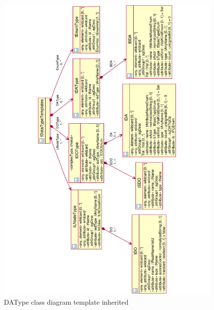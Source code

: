\begin{landscape}
	\begin{figure}
	  \includegraphics[angle=-90, width=1.0\linewidth]{chapters/ch-scl/figures/SCL-uml-DATypeTemplate-Deept2-inherited}
	  \caption{DAType class diagram template inherited}  
	  \label{fig:pdf-SCL-uml-DATypeTemplate-Deept2-inherited}
	\end{figure}
\end{landscape}

